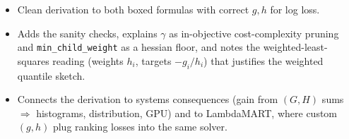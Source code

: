 \begin{interviewq}
\goodgreat
\begin{itemize}
    \item {} Clean derivation to both boxed formulas with correct $g, h$ for log loss.
    \item {} Adds the sanity checks, explains $\gamma$ as in-objective cost-complexity pruning and \texttt{min\_child\_weight} as a hessian floor, and notes the weighted-least-squares reading (weights $h_i$, targets $-g_i/h_i$) that justifies the weighted quantile sketch.
    \item {} Connects the derivation to systems consequences (gain from $(G,H)$ sums $\Rightarrow$ histograms, distribution, GPU) and to LambdaMART, where custom $(g,h)$ plug ranking losses into the same solver.
\end{itemize}

\end{interviewq}

